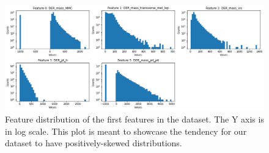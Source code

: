 \documentclass[10pt,conference,compsocconf]{IEEEtran}
\begin{document}
\begin{figure}
    \centering
    \includegraphics[scale = 0.45]{feature_distribution.png}
    \caption{Feature distribution of the first features in the dataset. The Y axis is in log scale. This plot is meant to showcase the tendency for our dataset to have positively-skewed distributions.}
    \label{fig:skew_fig}
\end{figure}



\end{document}
